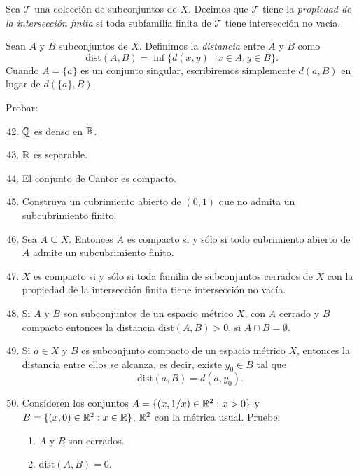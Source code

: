     \begin{definicion}
    Sea $\mathcal{T}$ una colección de subconjuntos de $X$. Decimos que $\mathcal{T}$ tiene la \textit{propiedad de la intersección finita} si toda subfamilia finita de $\mathcal{T}$ tiene intersección no vacía.
    \end{definicion}

    \begin{definicion}
    Sean $A$ y $B$ subconjuntos de $X$. Definimos la \textit{distancia} entre $A$ y $B$ como
    \[ \text{dist}(A, B) = \inf\{d(x, y) \mid x \in A, y \in B\}. \]
    Cuando $A = \{a\}$ es un conjunto singular, escribiremos simplemente $d(a, B)$ en lugar de $d(\{a\}, B)$.
    \end{definicion}

Probar:
\begin{enumerate}
    \setcounter{enumi}{41}
    \item $\mathbb{Q}$ es denso en $\mathbb{R}$.
    
    \item $\mathbb{R}$ es separable.
    
    \item El conjunto de Cantor es compacto.
    
    \item Construya un cubrimiento abierto de $(0, 1)$ que no admita un subcubrimiento finito.
    
    \item Sea $A \subseteq X$. Entonces $A$ es compacto si y sólo si todo cubrimiento abierto de $A$ admite un subcubrimiento finito.
    
    \item $X$ es compacto si y sólo si toda familia de subconjuntos cerrados de $X$ con la propiedad de la intersección finita tiene intersección no vacía.
    
    \item Si $A$ y $B$ son subconjuntos de un espacio métrico $X$, con $A$ cerrado y $B$ compacto entonces la distancia $\text{dist}(A, B) > 0$, si $A \cap B = \emptyset$.
    
    \item Si $a \in X$ y $B$ es subconjunto compacto de un espacio métrico $X$, entonces la distancia entre ellos se alcanza, es decir, existe $y_0 \in B$ tal que
    \[ \text{dist}(a, B) = d(a, y_0). \]
    
    \item Consideren los conjuntos $A = \{(x, 1/x) \in \mathbb{R}^2 : x > 0\}$ y $B = \{(x, 0) \in \mathbb{R}^2 : x \in \mathbb{R}\}$, $\mathbb{R}^2$ con la métrica usual. Pruebe:
    \begin{enumerate}
        \item[a)] $A$ y $B$ son cerrados.
        \item[b)] $\text{dist}(A, B) = 0$.
    \end{enumerate}
    

\end{enumerate}
